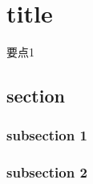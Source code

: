 \chapter{title}

\begin{introduction}
    \item 要点1
\end{introduction}

\section{section}

\subsection{subsection 1}

\subsection{subsection 2}

\cite{cn1}
